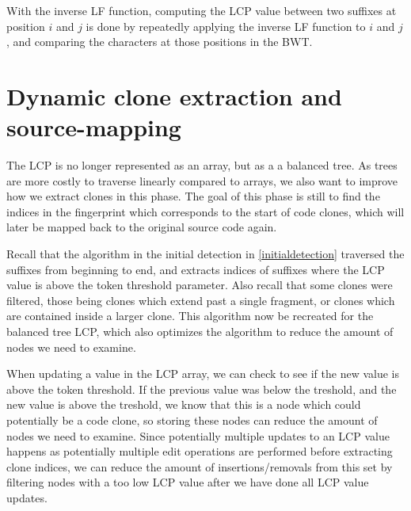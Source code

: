 With the inverse LF function, computing the LCP value between two suffixes at position $i$
and $j$ is done by repeatedly applying the inverse LF function to $i$ and $j$, and
comparing the characters at those positions in the BWT.




\section{Dynamic clone extraction and source-mapping}

The LCP is no longer represented as an array, but as a a balanced tree. As trees are more
costly to traverse linearly compared to arrays, we also want to improve how we extract
clones in this phase. The goal of this phase is still to find the indices in the
fingerprint which corresponds to the start of code clones, which will later be mapped back
to the original source code again.

Recall that the algorithm in the initial detection in \cref{initialdetection} traversed
the suffixes from beginning to end, and extracts indices of suffixes where the LCP value
is above the token threshold parameter. Also recall that some clones were filtered, those
being clones which extend past a single fragment, or clones which are contained inside a
larger clone. This algorithm now be recreated for the balanced tree LCP, which also
optimizes the algorithm to reduce the amount of nodes we need to examine.

When updating a value in the LCP array, we can check to see if the new value is above the
token threshold. If the previous value was below the treshold, and the new value is above
the treshold, we know that this is a node which could potentially be a code clone, so
storing these nodes can reduce the amount of nodes we need to examine. Since potentially
multiple updates to an LCP value happens as potentially multiple edit operations are
performed before extracting clone indices, we can reduce the amount of insertions/removals
from this set by filtering nodes with a too low LCP value after we have done all LCP value
updates.

